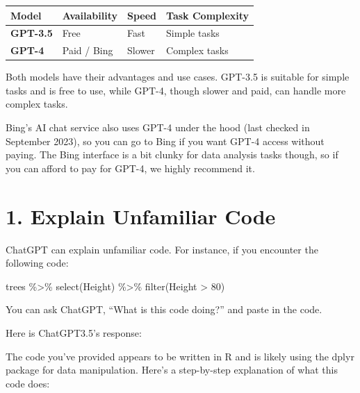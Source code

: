 \documentclass[
  letterpaper,
  DIV=11,
  numbers=noendperiod]{scrreprt}
\newenvironment{Shaded}{\begin{snugshade}}{\end{snugshade}}
\newcommand{\DecValTok}[1]{\textcolor[rgb]{0.68,0.00,0.00}{#1}}
\newcommand{\FunctionTok}[1]{\textcolor[rgb]{0.28,0.35,0.67}{#1}}
\newcommand{\NormalTok}[1]{\textcolor[rgb]{0.00,0.23,0.31}{#1}}
\newcommand{\SpecialCharTok}[1]{\textcolor[rgb]{0.37,0.37,0.37}{#1}}
\begin{document}
\begin{longtable}[]{@{}llll@{}}
\toprule\noalign{}
Model & Availability & Speed & Task Complexity \\
\midrule\noalign{}
\endhead
\bottomrule\noalign{}
\endlastfoot
\textbf{GPT-3.5} & Free & Fast & Simple tasks \\
\textbf{GPT-4} & Paid / Bing & Slower & Complex tasks \\
\end{longtable}

Both models have their advantages and use cases. GPT-3.5 is suitable for
simple tasks and is free to use, while GPT-4, though slower and paid,
can handle more complex tasks.

Bing's AI chat service also uses GPT-4 under the hood (last checked in
September 2023), so you can go to Bing if you want GPT-4 access without
paying. The Bing interface is a bit clunky for data analysis tasks
though, so if you can afford to pay for GPT-4, we highly recommend it.

\hypertarget{explain-unfamiliar-code}{%
\section{1. Explain Unfamiliar Code}\label{explain-unfamiliar-code}}

ChatGPT can explain unfamiliar code. For instance, if you encounter the
following code:

\begin{Shaded}
\begin{Highlighting}[]
\NormalTok{trees }\SpecialCharTok{\%\textgreater{}\%}
  \FunctionTok{select}\NormalTok{(Height) }\SpecialCharTok{\%\textgreater{}\%} 
  \FunctionTok{filter}\NormalTok{(Height }\SpecialCharTok{\textgreater{}} \DecValTok{80}\NormalTok{)}
\end{Highlighting}
\end{Shaded}

You can ask ChatGPT, ``What is this code doing?'' and paste in the code.

Here is ChatGPT3.5's response:

\leavevmode{}%
The code you've provided appears to be written in R and is likely using
the dplyr package for data manipulation. Here's a step-by-step
explanation of what this code does:
\end{document}
